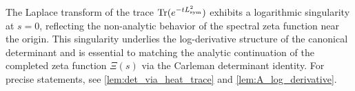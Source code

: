 \begin{remark}
\label{rem:zeta_trace_singularity}
The Laplace transform of the trace \( \operatorname{Tr}(e^{-t L_{\mathrm{sym}}^2}) \) exhibits a logarithmic singularity at \( s = 0 \), reflecting the non-analytic behavior of the spectral zeta function near the origin. This singularity underlies the log-derivative structure of the canonical determinant and is essential to matching the analytic continuation of the completed zeta function \( \Xi(s) \) via the Carleman determinant identity. For precise statements, see \cref{lem:det_via_heat_trace} and \cref{lem:A_log_derivative}.
\end{remark}
